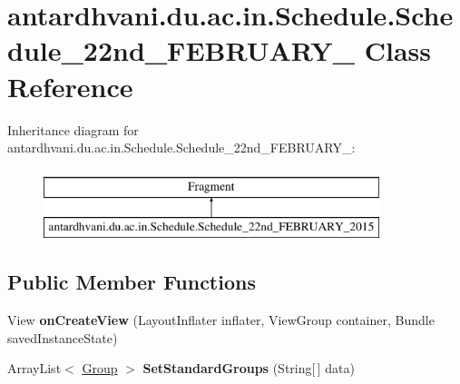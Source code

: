 \hypertarget{classantardhvani_1_1du_1_1ac_1_1in_1_1_schedule_1_1_schedule__22nd___f_e_b_r_u_a_r_y__2015}{}\section{antardhvani.\+du.\+ac.\+in.\+Schedule.\+Schedule\+\_\+22nd\+\_\+\+F\+E\+B\+R\+U\+A\+R\+Y\+\_ Class Reference}
\label{classantardhvani_1_1du_1_1ac_1_1in_1_1_schedule_1_1_schedule__22nd___f_e_b_r_u_a_r_y__2015}
Inheritance diagram for antardhvani.\+du.\+ac.\+in.\+Schedule.\+Schedule\+\_\+22nd\+\_\+\+F\+E\+B\+R\+U\+A\+R\+Y\+\_\+:\begin{figure}[H]
\begin{center}
\leavevmode
\includegraphics[height=2.000000cm]{classantardhvani_1_1du_1_1ac_1_1in_1_1_schedule_1_1_schedule__22nd___f_e_b_r_u_a_r_y__2015}
\end{center}
\end{figure}
\subsection*{Public Member Functions}
\begin{DoxyCompactItemize}
\item 
\hypertarget{classantardhvani_1_1du_1_1ac_1_1in_1_1_schedule_1_1_schedule__22nd___f_e_b_r_u_a_r_y__2015_a69add9d69648a546bedce8606f10fa56}{}View {\bfseries on\+Create\+View} (Layout\+Inflater inflater, View\+Group container, Bundle saved\+Instance\+State)\label{classantardhvani_1_1du_1_1ac_1_1in_1_1_schedule_1_1_schedule__22nd___f_e_b_r_u_a_r_y__2015_a69add9d69648a546bedce8606f10fa56}

\item 
\hypertarget{classantardhvani_1_1du_1_1ac_1_1in_1_1_schedule_1_1_schedule__22nd___f_e_b_r_u_a_r_y__2015_a27f1edc285b0c7f4b2b5c13300ac016c}{}Array\+List$<$ \hyperlink{classantardhvani_1_1du_1_1ac_1_1in_1_1_adapter_1_1_group}{Group} $>$ {\bfseries Set\+Standard\+Groups} (String\mbox{[}$\,$\mbox{]} data)\label{classantardhvani_1_1du_1_1ac_1_1in_1_1_schedule_1_1_schedule__22nd___f_e_b_r_u_a_r_y__2015_a27f1edc285b0c7f4b2b5c13300ac016c}

\end{DoxyCompactItemize}

